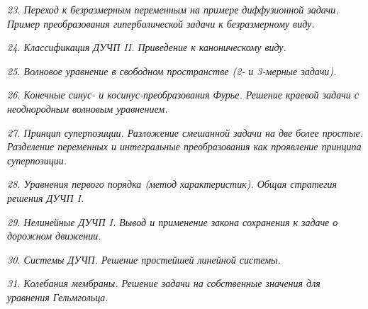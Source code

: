 \emph{23. Переход к безразмерным переменным на примере диффузионной задачи.
Пример преобразования гиперболической задачи к безразмерному виду.}

\newpage %

\emph{24. Классификация ДУЧП II. Приведение к каноническому виду.}

\newpage %

\emph{25. Волновое уравнение в свободном пространстве (2- и 3-мерные задачи).}

\newpage %

\emph{26. Конечные синус- и косинус-преобразования Фурье. Решение краевой задачи
с неоднородным волновым уравнением.}

\newpage %

\emph{27. Принцип суперпозиции. Разложение смешанной задачи на две более
простые. Разделение переменных и интегральные преобразования как проявление
принципа суперпозиции.}

\newpage %

\emph{28. Уравнения первого порядка (метод характеристик). Общая стратегия
решения ДУЧП I.}

\newpage %

\emph{29. Нелинейные ДУЧП I. Вывод и применение закона сохранения к задаче о
дорожном движении.}

\newpage %

\emph{30. Системы ДУЧП. Решение простейшей линейной системы.}

\newpage %

\emph{31. Колебания мембраны. Решение задачи на собственные значения для
уравнения Гельмгольца.}


